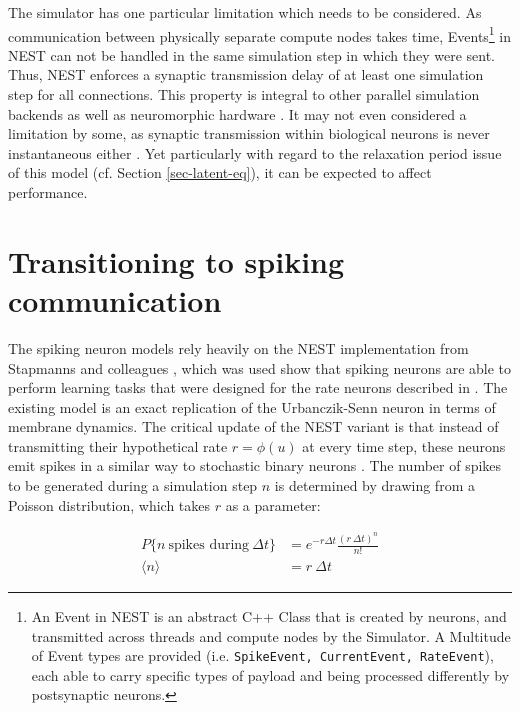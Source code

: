 The simulator has one particular limitation which needs to be considered. As communication between physically separate
compute nodes takes time, Events\footnote{An Event in NEST is an abstract C++ Class that is created by neurons, and
transmitted across threads and compute nodes by the Simulator. A Multitude of Event types are provided (i.e.
\texttt{SpikeEvent, CurrentEvent, RateEvent}), each able to carry specific types of payload and being processed
differently by postsynaptic neurons.} in NEST can not be handled in the same simulation step in which they were sent.
Thus, NEST enforces a synaptic transmission delay of at least one simulation step for all connections. This property is
integral to other parallel simulation backends \citep{Hines1997} as well as neuromorphic hardware
\citep{davies2018loihi}. It may not even considered a limitation by some, as synaptic transmission within biological
neurons is never instantaneous either \citep{kandel2021principles}. Yet particularly with regard to the relaxation
period issue of this model (cf. Section \ref{sec-latent-eq}), it can be expected to affect performance.


\section{Transitioning to spiking communication}

The spiking neuron models rely heavily on the NEST implementation from Stapmanns and colleagues \citep{Stapmanns2021},
which was used show that spiking neurons are able to perform learning tasks that were designed for the rate neurons
described in \cite{urbanczik2014learning}. The existing model is an exact replication of the Urbanczik-Senn neuron in
terms of membrane dynamics. The critical update of the NEST variant is that instead of transmitting their hypothetical
rate $r = \phi(u)$ at every time step, these neurons emit spikes in a similar way to stochastic binary neurons
\citep{Ginzburg1994}. The number of spikes to be generated during a simulation step $n$ is determined by drawing from a
Poisson distribution, which takes $r$ as a parameter:

\begin{align}
  P\{\textit{n} \ \text{spikes during} \ \Delta t\} & = e^{-r \Delta t} \frac{(r \ \Delta t) ^ n}{n!}\label{eq-pr-n-spikes} \\
  \langle \textit{n} \rangle                        & = r \ \Delta t \label{eq-n-spikes}
\end{align}

